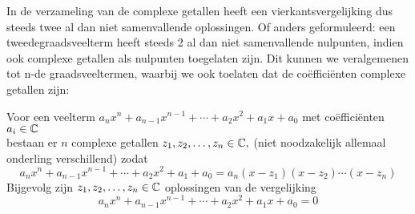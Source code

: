 \documentclass{ximera}
\begin{document}
In de verzameling van de complexe getallen heeft een vierkantsvergelijking dus steeds twee al dan niet samenvallende oplossingen. Of anders geformuleerd: een tweedegraadsveelterm heeft steeds 2 al dan niet samenvallende nulpunten, indien ook complexe getallen als nulpunten toegelaten zijn. Dit kunnen we veralgemenen tot n-de graadsveeltermen, waarbij we ook toelaten dat de coëfficiënten complexe getallen zijn:

\begin{proposition} 
	\label{def:hoofdstelling_algebra}
	
	Voor een veelterm $a_nx^n+a_{n-1}x^{n-1}+ \cdots +a_2x^2+a_1x+a_0$ met coëfficiënten $a_i\in \mathbb{C}$
	\\
	bestaan er $n$ complexe getallen $z_1,z_2,\ldots,z_n \in \mathbb{C},$ (niet noodzakelijk allemaal onderling verschillend) zodat 
	$$
	a_nx^n+a_{n-1}x^{n-1}+ \cdots +a_2x^2+a_1+a_0=a_n(x-z_1)(x-z_2)\cdots (x-z_n)
	$$ 
	Bijgevolg zijn $z_1,z_2,\ldots,z_n \in\mathbb{C}$ oplossingen van de vergelijking
	$$
	a_nx^n+a_{n-1}x^{n-1}+ \cdots +a_2x^2+a_1x+a_0=0
	$$
\end{proposition}
\end{document}

